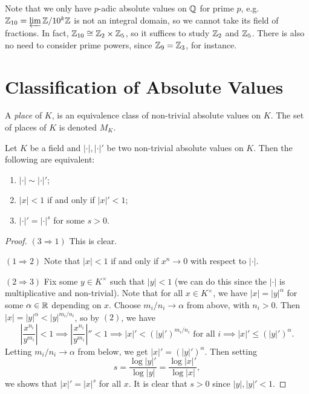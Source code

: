 \begin{remark}
  Note that we only have $p$-adic absolute values on
  $\mathbb{Q}$ for prime $p$, e.g.
  $\mathbb{Z}_{10} = \varprojlim \mathbb{Z} / 10^k \mathbb{Z}$ is
  not an integral domain, so we cannot take its
  field of fractions. In fact,
  $\mathbb{Z}_{10} \cong \mathbb{Z}_2 \times \mathbb{Z}_5$, so it suffices
  to study $\mathbb{Z}_2$ and $\mathbb{Z}_5$. There is also no need
  to consider prime powers, since $\mathbb{Z}_9 = \mathbb{Z}_3$, for
  instance.
\end{remark}

\section{Classification of Absolute Values}

\begin{definition}
  A \emph{place} of $K$,
  is an equivalence class of non-trivial
  absolute values on $K$. The set of places
  of $K$ is denoted $M_K$.
\end{definition}

\begin{lemma}
  Let $K$ be a field and
  $|\cdot|, |\cdot|'$ be two non-trivial absolute values on $K$.
  Then the following are equivalent:
  \begin{enumerate}
    \item $|\cdot| \sim |\cdot|'$;
    \item $|x| < 1$ if and only if $|x|' < 1$;
    \item $|\cdot|' = |\cdot|^s$ for some $s > 0$.
  \end{enumerate}
\end{lemma}

\begin{proof}
  $(3 \Rightarrow 1)$ This is clear.

  $(1 \Rightarrow 2)$ Note that
  $|x| < 1$ if and only if $x^n \to 0$ with respect
  to $|\cdot|$.

  $(2 \Rightarrow 3)$ Fix some $y \in K^\times$ such
  that $|y| < 1$ (we can do this since the
  $|\cdot|$ is multiplicative and non-trivial).
  Note that for all $x \in K^\times$, we have
  $|x| = |y|^\alpha$ for some $\alpha \in \mathbb{R}$
  depending on $x$. Choose $m_i / n_i \to \alpha$
  from above, with $n_i > 0$. Then
  $|x| = |y|^\alpha < |y|^{m_i / n_i}$, so by
  $(2)$, we have
  \[
    \left|\frac{x^{n_i}}{y^{m_i}}\right| < 1
    \implies 
    \left|\frac{x^{n_i}}{y^{m_i}}\right|'' < 1
    \implies |x|' < (|y|')^{m_i / n_i}
    \text{ for all $i$}
    \implies |x|' \le (|y|')^{\alpha}.
  \]
  Letting $m_i / n_i \to \alpha$ from below,
  we get $|x|' = (|y|')^{\alpha}$. Then setting
  \[
    s = \frac{\log |y|'}{\log |y|} = \frac{\log |x|'}{\log |x|},
  \]
  we shows that $|x|' = |x|^s$ for all $x$. It is
  clear that $s > 0$ since $|y|, |y|' < 1$.
\end{proof}

